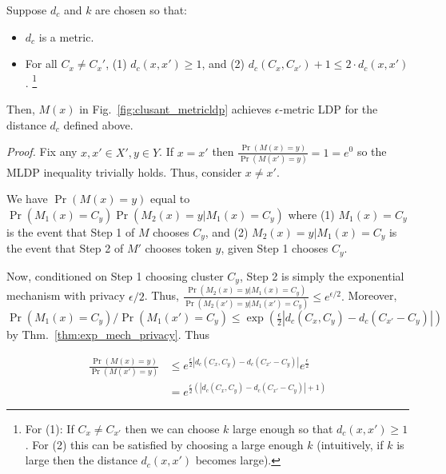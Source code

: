 \begin{theorem}\label{thm:clusant_mldp}
    Suppose $d_c$ and $k$ are chosen so that: 
    \begin{itemize}
    \setlength\itemsep{0em}
    \item $d_c$ is a metric.
    \item For all $C_x\not = C_x'$, (1) $d_c(x, x') \geq 1$, and (2) %
    $d_c(C_x, C_{x'}) + 1 \leq 2\cdot d_c(x, x')$.  \footnote{For (1): 
    If $C_x \not= C_{x'}$ then we can choose $k$ large enough so that $d_c(x, x') \geq 1$. For (2) this can be satisfied by choosing a large enough $k$ (intuitively, if $k$ is large then the distance $d_c(x, x')$ becomes large).}
\end{itemize}



  Then, $M(x)$ in Fig.~\ref{fig:clusant_metricldp}  achieves $\epsilon$-metric LDP for the distance $d_c$ defined above.
\end{theorem}

\noindent
\textit{Proof.} 
Fix any $x, x' \in X', y \in Y$. If $x = x'$ then $\frac{\Pr(M(x) = y)}{\Pr(M(x') = y)} = 1 = e^0$ so the MLDP inequality trivially holds. 
Thus, consider $x \not= x'$. 

We have $\Pr(M(x) = y)$ equal to $\Pr(M_1(x) = C_y)\Pr(M_2(x) = y | M_1(x) = C_y)$ where (1) $M_1(x) = C_y$ is the event that Step 1 of $M$ chooses $C_y$, and (2) $M_2(x) = y | M_1(x) = C_y$ is the event that Step 2 of $M'$ chooses token $y$, given Step 1 chooses $C_y$. 


Now, conditioned on  Step 1 choosing cluster $C_y$, Step 2 is simply the exponential mechanism with privacy $\epsilon/2$. Thus, $\frac{\Pr(M_2(x) = y | M_1(x) = C_y)}{\Pr(M_2(x') = y | M_1(x') = C_y)} \leq e^{\epsilon/2}.$ Moreover, $\Pr(M_1(x) = C_y)/\Pr(M_1(x') = C_y) \leq \exp(\frac{\epsilon}{2} |d_c(C_x, C_y) - d_c(C_{x'} - C_y)|)$ by Thm.~\ref{thm:exp_mech_privacy}. Thus

\begin{align*}
        \frac{\Pr(M(x) = y)}{\Pr(M(x') = y)} & \leq e^{\frac{\epsilon}{2} |d_c(C_x, C_y) - d_c(C_{x'} - C_y)|} e^{\frac{\epsilon}{2}}\\
        &= e^{\frac{\epsilon}{2}(|d_c(C_x, C_y) - d_c(C_{x'} - C_y)| +1)}
\end{align*}

